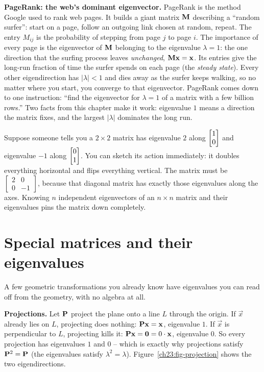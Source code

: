 \begin{applicationbox}
\textbf{PageRank: the web's dominant eigenvector.} PageRank is the method Google
used to rank web pages. It builds a giant matrix $\mathbf{M}$ describing a
``random surfer'': start on a page, follow an outgoing link chosen at random, repeat. The
entry $M_{ij}$ is the probability of stepping from page $j$ to page $i$. The
importance of every page is the eigenvector of $\mathbf{M}$ belonging to the
eigenvalue $\lambda=1$: the one direction that the surfing process leaves
\emph{unchanged}, $\mathbf{M}\mathbf{x}=\mathbf{x}$. Its entries give the long-run fraction
of time the surfer spends on each page (the \emph{steady state}). Every other
eigendirection has $|\lambda|<1$ and dies away as the surfer keeps walking, so no
matter where you start, you converge to that eigenvector. PageRank comes
down to one instruction: ``find the eigenvector for $\lambda=1$ of a matrix with a few
billion rows.'' Two facts from this chapter make it work: eigenvalue $1$ means a
direction the matrix fixes, and the largest $|\lambda|$ dominates the long run.
\end{applicationbox}

\begin{example}
\label{ch23:ex-readoff}
Suppose someone tells you a $2\times 2$ matrix has eigenvalue $2$ along
$\begin{bmatrix}1\\0\end{bmatrix}$ and eigenvalue $-1$ along $\begin{bmatrix}0\\1\end{bmatrix}$. You can sketch its
action immediately: it doubles everything horizontal and flips everything vertical.
The matrix must be $\begin{bmatrix}2&0\\0&-1\end{bmatrix}$, because that diagonal
matrix has exactly those eigenvalues along the axes. Knowing $n$ independent
eigenvectors of an $n\times n$ matrix and their eigenvalues pins the matrix down
completely.
\end{example}

\section{Special matrices and their eigenvalues}
\label{ch23:special}

A few geometric transformations you already know have eigenvalues you can read off
from the geometry, with no algebra at all.

\textbf{Projections.} Let $\mathbf{P}$ project the plane onto a line $L$ through the
origin. If $\vec{x}$ already lies on $L$, projecting does nothing:
$\mathbf{P}\mathbf{x}=\mathbf{x}$, eigenvalue $1$. If $\vec{x}$ is perpendicular to $L$,
projecting kills it: $\mathbf{P}\mathbf{x}=\mathbf{0}=0\cdot\mathbf{x}$, eigenvalue $0$. So
every projection has eigenvalues $1$ and $0$ -- which is exactly why projections
satisfy $\mathbf{P}^2=\mathbf{P}$ (the eigenvalues satisfy $\lambda^2=\lambda$).
Figure~\ref{ch23:fig-projection} shows the two eigendirections.

